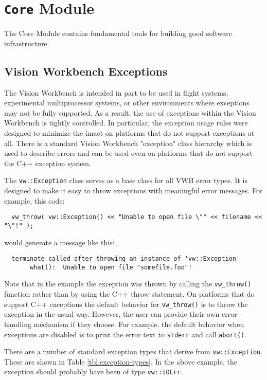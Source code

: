 \chapter{{\tt Core} Module}
\label{ch:core-module}

The Core Module contains fundamental tools for building good software infrastructure.

 \section{Vision Workbench Exceptions}
\label{sec:exceptions}

The Vision Workbench is intended in part to be used in flight systems,
experimental multiprocessor systems, or other environments where
exceptions may not be fully supported.  As a result, the use of
exceptions within the Vision Workbench is tightly controlled.  In
particular, the exception usage rules were designed to minimize the
imact on platforms that do not support exceptions at all.  There is a
standard Vision Workbench "exception" class hierarchy which is used to
describe errors and can be used even on platforms that do not support
the C++ exception system.
 
The \verb#vw::Exception# class serves as a base class for all VWB error
types.  It is designed to make it easy to throw exceptions with
meaningful error messages.  For example, this code:

\begin{verbatim}
  vw_throw( vw::Exception() << "Unable to open file \"" << filename << "\"!" );
\end{verbatim}

would generate a message like this:

\begin{verbatim}
  terminate called after throwing an instance of 'vw::Exception'
       what():  Unable to open file "somefile.foo"! 
\end{verbatim}

Note that in the example the exception was thrown by calling the
\verb#vw_throw()# function rather than by using the C++ throw
statement.  On platforms that do support C++ exceptions the default
behavior for \verb#vw_throw()# is to throw the exception in the usual
way.  However, the user can provide their own error-handling mechanism
if they choose.  For example, the default behavior when exceptions are
disabled is to print the error text to \verb#stderr# and call
\verb#abort()#.

There are a number of standard exception types that derive from
\verb#vw::Exception#.  These are shown in Table
\ref{tbl:exception-types}.  In the above example, the exception should
probably have been of type \verb#vw::IOErr#.  

